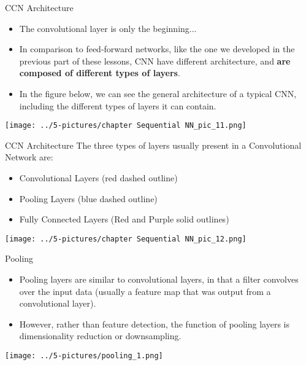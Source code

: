 \documentclass[11pt]{beamer}
\begin{document}
\begin{frame}{CCN Architecture}
\begin{itemize}
\item The convolutional layer is only the beginning...
\item In comparison to feed-forward networks, like the one we developed in the previous part of these lessons, CNN have different architecture, and \textbf{are composed of different types of layers}. 

\item In the figure below, we can see the general architecture of a typical CNN, including the different types of layers it can contain. 
\end{itemize}
	
	\begin{center}
	\texttt{[image: ../5-pictures/chapter Sequential NN\_pic\_11.png]}
	\end{center}
\end{frame}
\begin{frame}{CCN Architecture}
The three types of layers usually present in a Convolutional Network are:
	\begin{itemize}
		\item Convolutional Layers (red dashed outline)
		\item Pooling Layers (blue dashed outline)
		\item Fully Connected Layers (Red and Purple solid outlines)
	\end{itemize}
	\begin{center}
	\texttt{[image: ../5-pictures/chapter Sequential NN\_pic\_12.png]}
	\end{center}
\end{frame}
\begin{frame}{Pooling}

	\begin{itemize}
		\item Pooling layers are similar to convolutional layers, in that a filter convolves over the input data (usually a feature map that was output from a convolutional layer). 
		\item However, rather than feature detection, the function of pooling layers is dimensionality reduction or downsampling. 
	\end{itemize}
	\begin{center}
	\texttt{[image: ../5-pictures/pooling\_1.png]}
	\end{center}
\end{frame}
\end{document}
